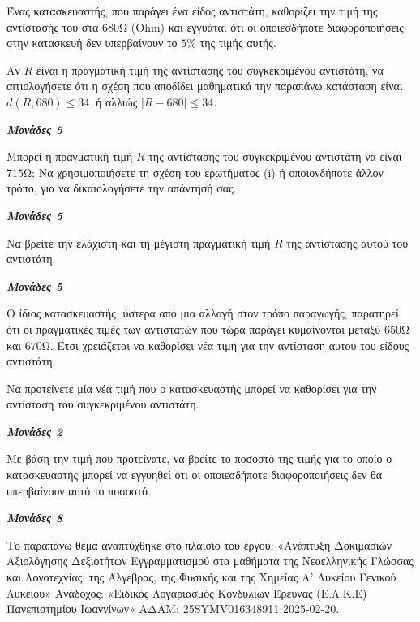 \documentclass[11pt,a4paper,twoside]{book}
\newcommand{\monades}[1]{
\hspace*{\fill}
\textbf{\textit{\textcolor{maincolor}{Μονάδες #1}}}}
\begin{document}
\begin{alist}
\item Ένας κατασκευαστής, που παράγει ένα είδος αντιστάτη, καθορίζει την τιμή της αντίστασής του στα $680$Ω (Ohm) και εγγυάται ότι οι οποιεσδήποτε διαφοροποιήσεις στην κατασκευή δεν υπερβαίνουν το $5\%$ της τιμής αυτής.

\begin{rlist}
\item Αν $R$ είναι η πραγματική τιμή της αντίστασης του συγκεκριμένου αντιστάτη, να αιτιολογήσετε ότι η σχέση που αποδίδει μαθηματικά την παραπάνω κατάσταση είναι $d(R,680) \leq 34\ $ ή αλλιώς $|R - 680| \leq 34$.
\monades{5}
\item Μπορεί η πραγματική τιμή $R$ της αντίστασης του συγκεκριμένου αντιστάτη να είναι $715$Ω; Να χρησιμοποιήσετε τη σχέση του ερωτήματος (i) ή οποιονδήποτε άλλον τρόπο, για να δικαιολογήσετε την απάντησή σας.
\monades{5}
\item Να βρείτε την ελάχιστη και τη μέγιστη πραγματική τιμή $R$ της αντίστασης αυτού του αντιστάτη.
\monades{5}
\end{rlist}
\item Ο ίδιος κατασκευαστής, ύστερα από μια αλλαγή στον τρόπο παραγωγής, παρατηρεί ότι οι πραγματικές τιμές των αντιστατών που τώρα παράγει κυμαίνονται μεταξύ $650$Ω και $670$Ω. Έτσι χρειάζεται να καθορίσει νέα τιμή για την αντίσταση αυτού του είδους αντιστάτη.

\begin{rlist}
\item Να προτείνετε μία νέα τιμή που ο κατασκευαστής μπορεί να καθορίσει για την αντίσταση του συγκεκριμένου αντιστάτη.
\monades{2}
\item Με βάση την τιμή που προτείνατε, να βρείτε το ποσοστό της τιμής για το οποίο ο κατασκευαστής μπορεί να εγγυηθεί ότι οι οποιεσδήποτε διαφοροποιήσεις δεν θα υπερβαίνουν αυτό το ποσοστό.
\monades{8}

{\footnotesize Το παραπάνω θέμα αναπτύχθηκε στο πλαίσιο του έργου: «Ανάπτυξη Δοκιμασιών Αξιολόγησης Δεξιοτήτων Εγγραμματισμού στα μαθήματα της Νεοελληνικής Γλώσσας και Λογοτεχνίας, της Άλγεβρας, της Φυσικής και της Χημείας Α' Λυκείου Γενικού Λυκείου» Ανάδοχος: «Ειδικός Λογαριασμός Κονδυλίων Έρευνας (Ε.Λ.Κ.Ε) Πανεπιστημίου Ιωαννίνων» ΑΔΑΜ: 25SYMV016348911 2025-02-20.}
\end{rlist}
\end{alist}

\vspace{4mm}
\end{document}
